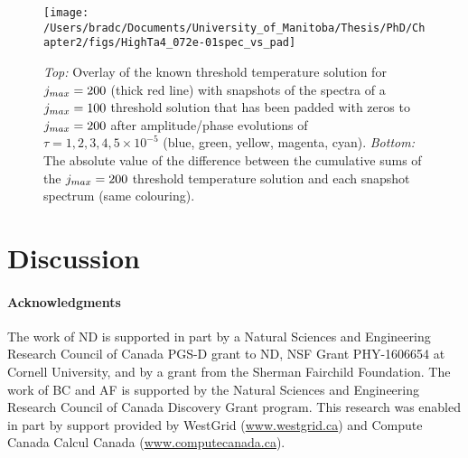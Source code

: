 \documentclass[../PhD.tex]{subfiles}
\begin{document}
\begin{figure}[ht]
	\centering
	\texttt{[image: /Users/bradc/Documents/University\_of\_Manitoba/Thesis/PhD/Chapter2/figs/HighTa4\_072e-01spec\_vs\_pad]}
	\caption[Comparison between a threshold temperature solution with $j_{max} = 200$ and the evolution of a $j_{max} = 100$ threshold temperature solution that has been padded by $100$ modes]{{\it Top:} Overlay of the known threshold temperature solution for $j_{max} = 200$ (thick red line) with snapshots of the spectra of a $j_{max} = 100$ threshold solution that has been padded with zeros to $j_{max} = 200$ after amplitude/phase evolutions of $\tau =1, 2, 3, 4, 5 \times 10^{-5}$ (blue, green, yellow, magenta, cyan). {\it Bottom:} The absolute value of the difference between the cumulative sums of the $j_{max} = 200$ threshold temperature solution and each snapshot spectrum (same colouring).}
	\label{fig: HighTa4_072e-01spec_vs_pad}
\end{figure}


\section{Discussion}
\label{sec: discussion}


\paragraph*{Acknowledgments} The work of ND is supported in part by a Natural Sciences and Engineering
Research Council of Canada PGS-D grant to ND, NSF Grant PHY-1606654
at Cornell University, and by a grant from the Sherman
Fairchild Foundation.
The work of BC and AF is supported by the Natural Sciences
and Engineering Research Council of Canada Discovery Grant program.
This research was enabled in part by support provided by WestGrid
(\href{www.westgrid.ca}{www.westgrid.ca}) and Compute Canada Calcul Canada (\href{www.computecanada.ca}{www.computecanada.ca}).

\end{document}
